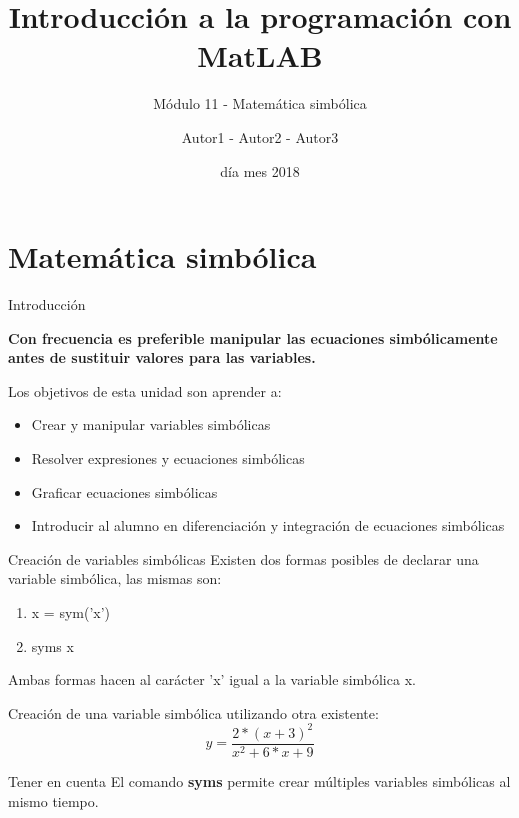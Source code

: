 \documentclass{bredelebeamer}
\title[Programación en MatLAB]{Introducción a la programación con MatLAB}
\subtitle{Módulo 11 - Matemática simbólica}
\author{Autor1 - Autor2 - Autor3\inst{1}}
\institute[UTN.BA]
{
  \inst{1}%
  Universidad Tecnológica Nacional\\
  Facultad Regional Buenos Aires
  }
\date{día mes 2018}
\begin{document}
\begin{frame}
  \titlepage 
\end{frame}



\section{Matemática simbólica}

\begin{frame}{Introducción}
\begin{center}
\textbf{Con frecuencia es preferible manipular las ecuaciones simbólicamente antes de sustituir valores para las variables.}
\end{center} 
Los objetivos de esta unidad son aprender a:
\begin{itemize}
\item Crear y manipular variables simbólicas
\item Resolver expresiones y ecuaciones simbólicas
\item Graficar ecuaciones simbólicas
\item Introducir al alumno en diferenciación y integración de ecuaciones simbólicas
\end{itemize}
\end{frame}

\begin{frame}{Creación de variables simbólicas}
Existen dos formas posibles de declarar una variable simbólica, las mismas son:
\begin{enumerate}
\item x = sym('x')
\item syms x
\end{enumerate}
\begin{center}
Ambas formas hacen al carácter 'x' igual a la variable simbólica x.
\end{center}
Creación de una variable simbólica utilizando otra existente:
\begin{equation*}
y = \frac{2*(x+3)^2}{x^2+6*x+9}
\end{equation*}
\begin{block}{Tener en cuenta}
El comando \textbf{syms} permite crear múltiples variables simbólicas al mismo tiempo.
\end{block}
\end{frame}
\end{document}
